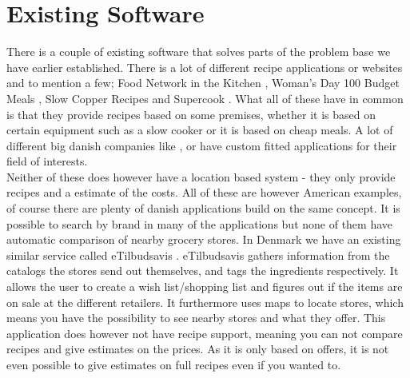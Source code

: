 \section{Existing Software}
\label{sec:exsoft}

There is a couple of existing software that solves parts of the problem base we have earlier established. There is a lot of different recipe applications or websites and to mention a few;  Food Network in the Kitchen \cite{recipe_FN}, Woman's Day 100 Budget Meals \cite{recipe_woman}, Slow Copper Recipes \cite{recipe_SC} and Supercook \cite{recipe_supercook}. What all of these have in common is that they provide recipes based on some premises, whether it is based on certain equipment such as a slow cooker or it is based on cheap meals. A lot of different big danish companies like ,  or  have custom fitted applications for their field of interests.\\
 Neither of these does however have a location based system - they only provide recipes and a estimate of the costs. All of these are however American examples, of course there are plenty of danish applications build on the same concept. It is possible to search by brand in many of the applications but none of them have automatic comparison of nearby grocery stores. In Denmark we have an existing similar service called eTilbudsavis \cite{etilbudsavis}. eTilbudsavis gathers information from the catalogs the stores send out themselves, and tags the ingredients respectively. It allows the user to create a wish list/shopping list and figures out if the items are on sale at the different retailers. It furthermore uses maps to locate stores, which means you have the possibility to see nearby stores and what they offer. This application does however not have recipe support, meaning you can not compare recipes and give estimates on the prices. As it is only based on offers, it is not even possible to give estimates on full recipes even if you wanted to.
